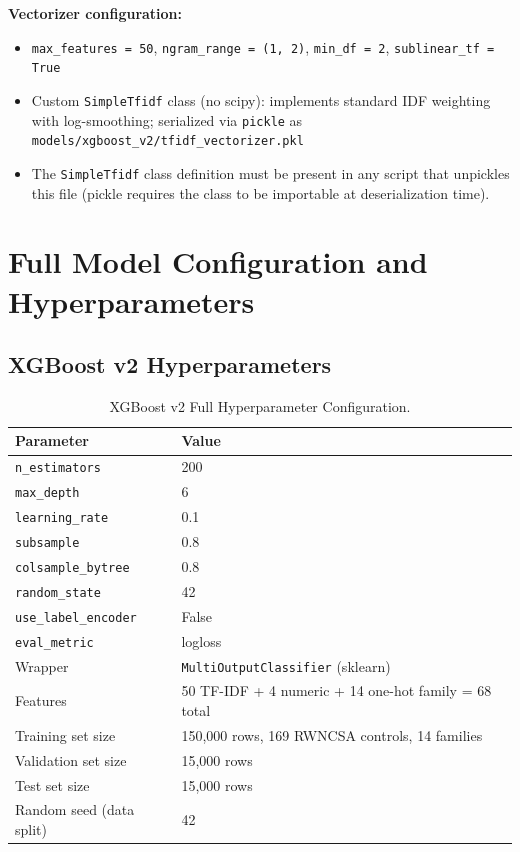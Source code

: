 \documentclass[11pt,a4paper]{article}
\begin{document}
\noindent\textbf{Vectorizer configuration:}
\begin{itemize}
  \item \texttt{max\_features = 50}, \texttt{ngram\_range = (1, 2)}, \texttt{min\_df = 2},
    \texttt{sublinear\_tf = True}
  \item Custom \texttt{SimpleTfidf} class (no scipy): implements standard IDF weighting
    with log-smoothing; serialized via \texttt{pickle} as
    \texttt{models/xgboost\_v2/tfidf\_vectorizer.pkl}
  \item The \texttt{SimpleTfidf} class definition must be present in any script that
    unpickles this file (pickle requires the class to be importable at deserialization time).
\end{itemize}

\section{Full Model Configuration and Hyperparameters}
\label{sec:hyperparams}

\subsection{XGBoost v2 Hyperparameters}

\begin{table}[ht]
\centering
\caption{XGBoost v2 Full Hyperparameter Configuration.}
\label{tab:xgb-hyperparams}
\begin{tabular}{ll}
\toprule
\textbf{Parameter} & \textbf{Value} \\
\midrule
\texttt{n\_estimators}      & 200 \\
\texttt{max\_depth}         & 6 \\
\texttt{learning\_rate}     & 0.1 \\
\texttt{subsample}          & 0.8 \\
\texttt{colsample\_bytree}  & 0.8 \\
\texttt{random\_state}      & 42 \\
\texttt{use\_label\_encoder} & False \\
\texttt{eval\_metric}       & logloss \\
Wrapper                     & \texttt{MultiOutputClassifier} (sklearn) \\
Features                    & 50 TF-IDF + 4 numeric + 14 one-hot family = 68 total \\
Training set size           & 150{,}000 rows, 169 RWNCSA controls, 14 families \\
Validation set size         & 15{,}000 rows \\
Test set size               & 15{,}000 rows \\
Random seed (data split)    & 42 \\
\bottomrule
\end{tabular}
\end{table}
\end{document}
